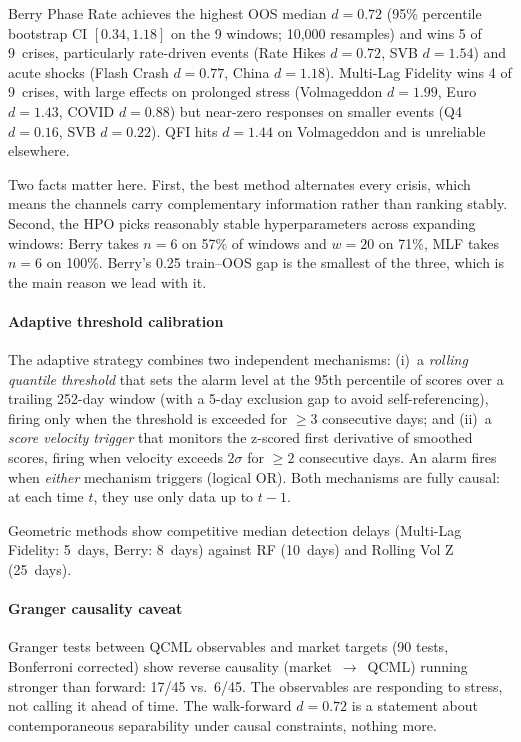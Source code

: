 \documentclass[3p]{elsarticle}
\begin{document}
Berry Phase Rate achieves the highest OOS median $d = 0.72$
(95\% percentile bootstrap CI $[0.34, 1.18]$ on the 9 windows; 10{,}000
resamples) and wins 5 of 9~crises, particularly rate-driven events
(Rate Hikes $d = 0.72$, SVB $d = 1.54$) and acute shocks (Flash Crash
$d = 0.77$, China $d = 1.18$).  Multi-Lag Fidelity wins 4 of
9~crises, with large effects on prolonged stress (Volmageddon
$d = 1.99$, Euro $d = 1.43$, COVID $d = 0.88$) but near-zero
responses on smaller events (Q4 $d = 0.16$, SVB $d = 0.22$).  QFI
hits $d = 1.44$ on Volmageddon and is unreliable elsewhere.

Two facts matter here.  First, the best method alternates every
crisis, which means the channels carry complementary information
rather than ranking stably.  Second, the HPO picks reasonably stable
hyperparameters across expanding windows: Berry takes $n{=}6$ on
57\% of windows and $w{=}20$ on 71\%, MLF takes $n{=}6$ on 100\%.
Berry's 0.25 train--OOS gap is the smallest of the three, which is
the main reason we lead with it.

\paragraph{Adaptive threshold calibration}\label{subsec:adaptive_threshold}
The adaptive strategy combines two independent mechanisms:
(i)~a \emph{rolling quantile threshold} that sets the alarm level at
the 95th percentile of scores over a trailing 252-day window
(with a 5-day exclusion gap to avoid self-referencing), firing only
when the threshold is exceeded for $\geq 3$ consecutive days; and
(ii)~a \emph{score velocity trigger} that monitors the z-scored
first derivative of smoothed scores, firing when velocity exceeds
$2\sigma$ for $\geq 2$ consecutive days.  An alarm fires when
\emph{either} mechanism triggers (logical OR).  Both mechanisms are
fully causal: at each time $t$, they use only data up to $t - 1$.

Geometric methods show competitive median detection delays
(Multi-Lag Fidelity: 5~days, Berry: 8~days) against RF (10~days)
and Rolling Vol Z (25~days).

\paragraph{Granger causality caveat}
Granger tests between QCML observables and market targets
(90 tests, Bonferroni corrected) show reverse causality
(market~$\to$~QCML) running stronger than forward: 17/45 vs.\ 6/45.
The observables are responding to stress, not calling it ahead of
time.  The walk-forward $d = 0.72$ is a statement about
contemporaneous separability under causal constraints, nothing more.
\end{document}
